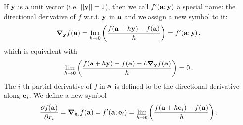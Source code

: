         If $\vb{y}$ is a unit vector (i.e. $||\vb{y}|| = 1$), then we call $f'(\vb{a};\vb{y})$ a special name: the directional derivative of $f$ w.r.t. $\vb{y}$ in $\vb{a}$ and we assign a new symbol to it:
        \begin{equation}
            \grad_{\vb{y}} f(\vb{a}) = \lim_{h \to 0} \qty( \frac{f(\vb{a} + h\vb{y}) - f(\vb{a})}{h} ) = f'(\vb{a};\vb{y}) \thinspace ,
        \end{equation}
        which is equivalent with
        \begin{equation}
            \lim_{h \to 0} \qty( \frac{f(\vb{a} + h \vb{y}) - f(\vb{a}) - h \grad_{\vb{y}} f(\vb{a})}{h} ) = 0 \thinspace .
        \end{equation}
        The $i$-th partial derivative of $f$ in $\vb{a}$ is defined to be the directional derivative along $\vb{e}_i$. We define a new symbol
        \begin{equation}
            \pdv{f(\vb{a})}{x_i} = \grad_{\vb{e}_i} f(\vb{a}) = f'(\vb{a};\vb{e}_i) = \lim_{h \to 0} \qty( \frac{f(\vb{a} + h\vb{e}_i) - f(\vb{a})}{h} ) \thinspace .
        \end{equation}

